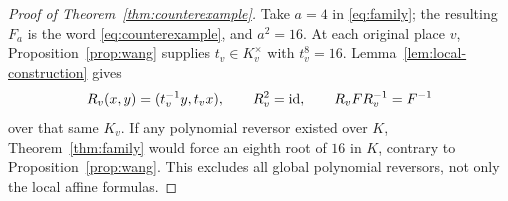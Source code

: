 

\begin{proof}[Proof of Theorem~\ref{thm:counterexample}]
Take $a=4$ in \eqref{eq:family}; the resulting $F_a$ is the
word \eqref{eq:counterexample}, and $a^2=16$.
At each original place $v$, Proposition~\ref{prop:wang}
supplies $t_v\in K_v^\times$ with $t_v^8=16$.
Lemma~\ref{lem:local-construction} gives
\[
  R_v(x,y)=(t_v^{-1}y,t_vx),\qquad
  R_v^2=\mathrm{id},\qquad R_vFR_v^{-1}=F^{-1}
\]
over that same $K_v$.
If any polynomial reversor existed over $K$,
Theorem~\ref{thm:family} would force an eighth root of $16$
in $K$, contrary to Proposition~\ref{prop:wang}.
This excludes all global polynomial reversors, not only the
local affine formulas.
\end{proof}

